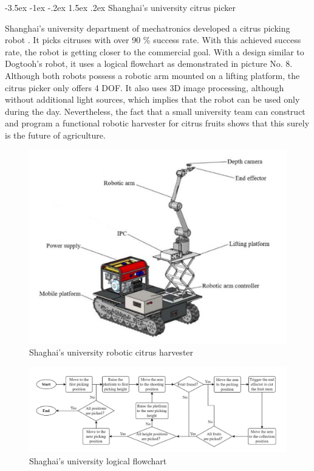 \documentclass[a4paper,10pt]{article}
\makeatletter
\theoremstyle{definition}
\renewcommand\subsection{\@startsection {subsection}{1}{\z@}%
                                   {-3.5ex \@plus -1ex \@minus -.2ex}%
                                   {1.5ex \@plus.2ex}%
                                   {\normalsize\bfseries}}
\makeatother
\begin{document}
\subsection{Shanghai's university citrus picker}
\label{subsec:4}

Shanghai's university department of mechatronics developed a citrus picking robot \cite{9515884}. It picks citruses with over 90 \% success rate. With this achieved success rate, the robot is getting closer to the commercial goal. With a design similar to Dogtooh's robot, it uses a logical flowchart as demonstrated in picture No. 8.  Although both robots possess a robotic arm mounted on a lifting platform, the citrus picker only offers 4 DOF. It also uses 3D image processing, although without additional light sources, which implies that the robot can be used only during the day. Nevertheless, the fact that a small university team can construct and program a functional robotic harvester for citrus fruits shows that this surely is the future of agriculture. 

\bigskip
\begin{figure}[h]
\begin{center}
\includegraphics[scale=0.7]{image/shanghai.jpg}
\caption{Shaghai's university robotic citrus harvester\cite{9515884}}
\end{center}
\end{figure}

\bigskip
\begin{figure}[h]
\begin{center}
\includegraphics[scale=0.7]{image/flowchart.jpg}
\caption{Shaghai's university logical flowchart\cite{9515884}}
\end{center}
\end{figure}
\end{document}
